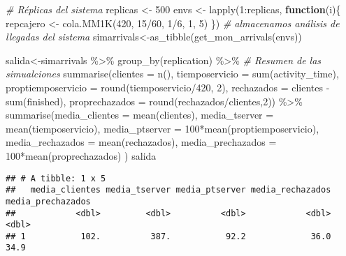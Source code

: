 \documentclass[
]{book}
\newenvironment{Shaded}{\begin{snugshade}}{\end{snugshade}}
\newcommand{\AttributeTok}[1]{\textcolor[rgb]{0.77,0.63,0.00}{#1}}
\newcommand{\CommentTok}[1]{\textcolor[rgb]{0.56,0.35,0.01}{\textit{#1}}}
\newcommand{\ControlFlowTok}[1]{\textcolor[rgb]{0.13,0.29,0.53}{\textbf{#1}}}
\newcommand{\DecValTok}[1]{\textcolor[rgb]{0.00,0.00,0.81}{#1}}
\newcommand{\FunctionTok}[1]{\textcolor[rgb]{0.00,0.00,0.00}{#1}}
\newcommand{\NormalTok}[1]{#1}
\newcommand{\OtherTok}[1]{\textcolor[rgb]{0.56,0.35,0.01}{#1}}
\newcommand{\SpecialCharTok}[1]{\textcolor[rgb]{0.00,0.00,0.00}{#1}}
\theoremstyle{definition}
\theoremstyle{definition}
\theoremstyle{definition}
\theoremstyle{definition}
\theoremstyle{remark}
\begin{document}
\begin{Shaded}
\begin{Highlighting}[]
\CommentTok{\# Réplicas del sistema}
\NormalTok{replicas }\OtherTok{\textless{}{-}} \DecValTok{500}
\NormalTok{envs }\OtherTok{\textless{}{-}} \FunctionTok{lapply}\NormalTok{(}\DecValTok{1}\SpecialCharTok{:}\NormalTok{replicas, }\ControlFlowTok{function}\NormalTok{(i)\{}
\NormalTok{  repcajero }\OtherTok{\textless{}{-}} \FunctionTok{cola.MM1K}\NormalTok{(}\DecValTok{420}\NormalTok{, }\DecValTok{15}\SpecialCharTok{/}\DecValTok{60}\NormalTok{, }\DecValTok{1}\SpecialCharTok{/}\DecValTok{6}\NormalTok{, }\DecValTok{1}\NormalTok{, }\DecValTok{5}\NormalTok{)}
\NormalTok{\})}
\CommentTok{\# almacenamos análisis de llegadas del sistema}
\NormalTok{simarrivals}\OtherTok{\textless{}{-}}\FunctionTok{as\_tibble}\NormalTok{(}\FunctionTok{get\_mon\_arrivals}\NormalTok{(envs))}

\NormalTok{salida}\OtherTok{\textless{}{-}}\NormalTok{simarrivals }\SpecialCharTok{\%\textgreater{}\%} 
  \FunctionTok{group\_by}\NormalTok{(replication) }\SpecialCharTok{\%\textgreater{}\%} 
  \CommentTok{\# Resumen de las simualciones}
  \FunctionTok{summarise}\NormalTok{(}\AttributeTok{clientes =} \FunctionTok{n}\NormalTok{(), }
            \AttributeTok{tiemposervicio =} \FunctionTok{sum}\NormalTok{(activity\_time),}
            \AttributeTok{proptiemposervicio =} \FunctionTok{round}\NormalTok{(tiemposervicio}\SpecialCharTok{/}\DecValTok{420}\NormalTok{, }\DecValTok{2}\NormalTok{),}
            \AttributeTok{rechazados =}\NormalTok{ clientes }\SpecialCharTok{{-}} \FunctionTok{sum}\NormalTok{(finished),}
            \AttributeTok{proprechazados =} \FunctionTok{round}\NormalTok{(rechazados}\SpecialCharTok{/}\NormalTok{clientes,}\DecValTok{2}\NormalTok{)) }\SpecialCharTok{\%\textgreater{}\%} 
  \FunctionTok{summarise}\NormalTok{(}\AttributeTok{media\_clientes =} \FunctionTok{mean}\NormalTok{(clientes),}
            \AttributeTok{media\_tserver =} \FunctionTok{mean}\NormalTok{(tiemposervicio),}
            \AttributeTok{media\_ptserver =} \DecValTok{100}\SpecialCharTok{*}\FunctionTok{mean}\NormalTok{(proptiemposervicio),}
            \AttributeTok{media\_rechazados =} \FunctionTok{mean}\NormalTok{(rechazados),}
            \AttributeTok{media\_prechazados =} \DecValTok{100}\SpecialCharTok{*}\FunctionTok{mean}\NormalTok{(proprechazados)}
\NormalTok{            )}
\NormalTok{salida}
\end{Highlighting}
\end{Shaded}

\begin{verbatim}
## # A tibble: 1 x 5
##   media_clientes media_tserver media_ptserver media_rechazados media_prechazados
##            <dbl>         <dbl>          <dbl>            <dbl>             <dbl>
## 1           102.          387.           92.2             36.0              34.9
\end{verbatim}
\end{document}

